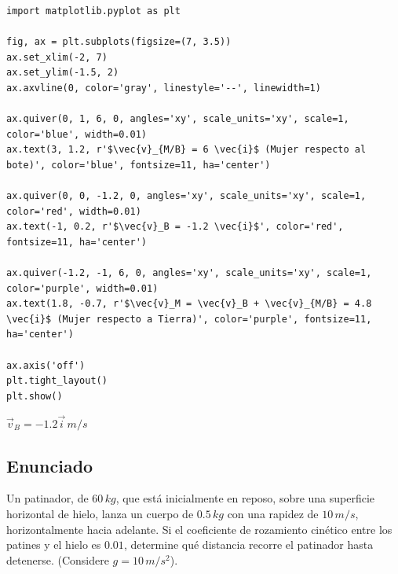 \documentclass[12pt, a4paper]{article}
\begin{document}
\begin{lstlisting}
import matplotlib.pyplot as plt

fig, ax = plt.subplots(figsize=(7, 3.5))
ax.set_xlim(-2, 7)
ax.set_ylim(-1.5, 2)
ax.axvline(0, color='gray', linestyle='--', linewidth=1)

ax.quiver(0, 1, 6, 0, angles='xy', scale_units='xy', scale=1, color='blue', width=0.01)
ax.text(3, 1.2, r'$\vec{v}_{M/B} = 6 \vec{i}$ (Mujer respecto al bote)', color='blue', fontsize=11, ha='center')

ax.quiver(0, 0, -1.2, 0, angles='xy', scale_units='xy', scale=1, color='red', width=0.01)
ax.text(-1, 0.2, r'$\vec{v}_B = -1.2 \vec{i}$', color='red', fontsize=11, ha='center')

ax.quiver(-1.2, -1, 6, 0, angles='xy', scale_units='xy', scale=1, color='purple', width=0.01)
ax.text(1.8, -0.7, r'$\vec{v}_M = \vec{v}_B + \vec{v}_{M/B} = 4.8 \vec{i}$ (Mujer respecto a Tierra)', color='purple', fontsize=11, ha='center')

ax.axis('off')
plt.tight_layout()
plt.show()
\end{lstlisting}

\begin{tcolorbox}[colback=green!5!white, colframe=green!50!black, title=Respuesta Final]
\centering \Large $\vec{v}_B = -1.2 \vec{i} \, \si{m/s}$
\end{tcolorbox}

\newpage

\subsection*{Enunciado}
Un patinador, de $60 \, \si{kg}$, que está inicialmente en reposo, sobre una superficie horizontal de hielo, lanza un cuerpo de $0.5 \, \si{kg}$ con una rapidez de $10 \, \si{m/s}$, horizontalmente hacia adelante. Si el coeficiente de rozamiento cinético entre los patines y el hielo es $0.01$, determine qué distancia recorre el patinador hasta detenerse. (Considere $g = 10 \, \si{m/s^2}$).

\begin{center}
\end{center}
\end{document}
